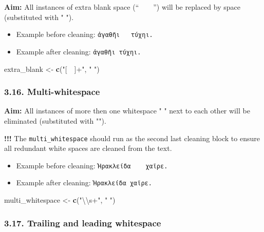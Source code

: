 \documentclass[]{article}
\newenvironment{Shaded}{\begin{snugshade}}{\end{snugshade}}
\newcommand{\CharTok}[1]{\textcolor[rgb]{0.31,0.60,0.02}{#1}}
\newcommand{\KeywordTok}[1]{\textcolor[rgb]{0.13,0.29,0.53}{\textbf{#1}}}
\newcommand{\NormalTok}[1]{#1}
\newcommand{\StringTok}[1]{\textcolor[rgb]{0.31,0.60,0.02}{#1}}
\providecommand{\tightlist}{%
  \setlength{\itemsep}{0pt}\setlength{\parskip}{0pt}}
\begin{document}
\textbf{Aim:} All instances of extra blank space (``  '') will be
replaced by space (substituted with " ").

\begin{itemize}
\tightlist
\item
  Example before cleaning: \texttt{ἀγαθῆι  \ τύχηι.}
\item
  Example after cleaning: \texttt{ἀγαθῆι\ τύχηι.}
\end{itemize}

\begin{Shaded}
\begin{Highlighting}[]
\NormalTok{extra_blank <-}\StringTok{ }\KeywordTok{c}\NormalTok{(}\StringTok{"[ ]+"}\NormalTok{, }\StringTok{" "}\NormalTok{)}
\end{Highlighting}
\end{Shaded}

\hypertarget{multi-whitespace}{%
\subsubsection{3.16. Multi-whitespace}\label{multi-whitespace}}

\textbf{Aim:} All instances of more then one whitespace " " next to each
other will be eliminated (substituted with "").

\textbf{!!!} The \texttt{multi\_whitespace} should run as the second
last cleaning block to ensure all redundant white spaces are cleaned
from the text.

\begin{itemize}
\tightlist
\item
  Example before cleaning: \texttt{Ἡρακλείδα\ \ \ \ χαῖρε.}
\item
  Example after cleaning: \texttt{Ἡρακλείδα\ χαῖρε.}
\end{itemize}

\begin{Shaded}
\begin{Highlighting}[]
\NormalTok{multi_whitespace <-}\StringTok{ }\KeywordTok{c}\NormalTok{(}\StringTok{"}\CharTok{\textbackslash{}\textbackslash{}}\StringTok{s+"}\NormalTok{, }\StringTok{" "}\NormalTok{)}
\end{Highlighting}
\end{Shaded}

\hypertarget{trailing-and-leading-whitespace}{%
\subsubsection{3.17. Trailing and leading
whitespace}\label{trailing-and-leading-whitespace}}
\end{document}
